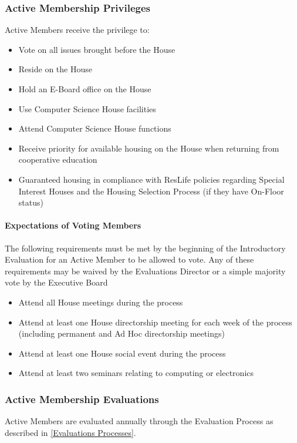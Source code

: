 \documentclass{article}
\newcommand{\asubsection}[1]{\subsubsection{#1} \label{#1}}
\newcommand{\asubsubsection}[1]{\paragraph{#1} \label{#1}}
\begin{document}
\asubsection{Active Membership Privileges}
Active Members receive the privilege to:
\begin{itemize}
	\item Vote on all issues brought before the House
	\item Reside on the House
	\item Hold an E-Board office on the House
	\item Use Computer Science House facilities
	\item Attend Computer Science House functions
	\item Receive priority for available housing on the House when returning from cooperative education
	\item Guaranteed housing in compliance with ResLife policies regarding Special Interest Houses and the Housing Selection Process (if they have On-Floor status)
\end{itemize}

\asubsubsection{Expectations of Voting Members}
The following requirements must be met by the beginning of the Introductory Evaluation for an Active Member to be allowed to vote. 
Any of these requirements may be waived by the Evaluations Director or a simple majority vote by the Executive Board
\begin{itemize}
\item Attend all House meetings during the process
\item Attend at least one House directorship meeting for each week of the process (including permanent and Ad Hoc directorship meetings)
\item Attend at least one House social event during the process
\item Attend at least two seminars relating to computing or electronics
\end{itemize}
\asubsection{Active Membership Evaluations}
Active Members are evaluated annually through the Evaluation Process as described in \ref{Evaluations Processes}.

\end{document}
